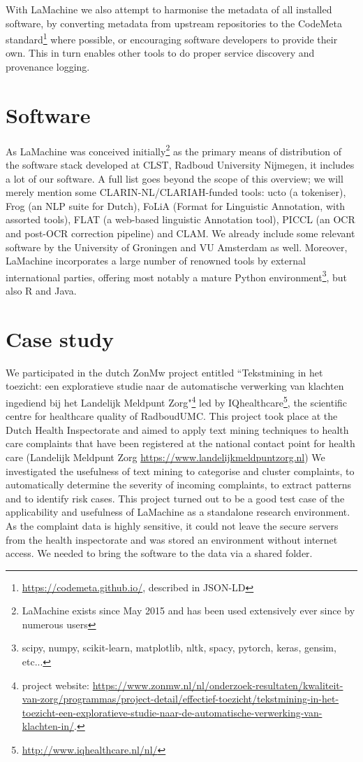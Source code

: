 \documentclass[a4paper,11pt]{article}
\begin{document}
With LaMachine we also attempt to harmonise the metadata of all installed software, by converting metadata from upstream repositories to
the CodeMeta standard\footnote{\url{https://codemeta.github.io/}, described in JSON-LD} \cite{codemeta,codemetar} where possible, or encouraging software developers to provide
their own. This in turn enables other tools to do proper service discovery and provenance logging.

\section{Software}

As LaMachine was conceived initially\footnote{LaMachine exists since May 2015 and has been used extensively ever since by
numerous users} as the primary means of distribution of the software stack developed at CLST,
Radboud University Nijmegen, it includes a lot of our software. A full list goes beyond the scope of this overview; we
will merely mention some CLARIN-NL/CLARIAH-funded tools: ucto (a tokeniser), Frog (an NLP suite for Dutch), FoLiA (Format
for Linguistic Annotation, with assorted tools), FLAT (a web-based linguistic Annotation tool), PICCL (an OCR and
post-OCR correction pipeline) and CLAM. We already include some relevant software by the University of Groningen and VU
Amsterdam as well. Moreover, LaMachine incorporates a large number of renowned tools by external international parties,
offering most notably a mature Python environment\footnote{scipy, numpy, scikit-learn, matplotlib, nltk, spacy, pytorch,
keras, gensim, etc...}, but also R and Java.


\section{Case study}\label{sec-case}

We participated in the dutch ZonMw project entitled ``Tekstmining in het toezicht: een exploratieve studie naar de
automatische verwerking van klachten ingediend bij het Landelijk Meldpunt Zorg"\footnote{project website:
\url{https://www.zonmw.nl/nl/onderzoek-resultaten/kwaliteit-van-zorg/programmas/project-detail/effectief-toezicht/tekstmining-in-het-toezicht-een-exploratieve-studie-naar-de-automatische-verwerking-van-klachten-in/}.
} led by IQhealthcare\footnote{\url{http://www.iqhealthcare.nl/nl/}}, the scientific centre for healthcare quality of RadboudUMC.
This project took place at the Dutch Health Inspectorate and aimed to apply text mining techniques to health care complaints that have been registered at the national contact point for health care (Landelijk Meldpunt Zorg \url{https://www.landelijkmeldpuntzorg.nl})
We investigated the usefulness of text mining to categorise and cluster complaints, to automatically determine the
severity of incoming complaints, to extract patterns  and to identify risk cases. This project turned out to be a good
test case of the applicability and usefulness of LaMachine as a standalone research environment.
As the complaint data is highly sensitive, it could not leave the secure servers from the health inspectorate and was
stored an environment without internet access. We needed to bring the software to the data via a shared folder.
\end{document}
